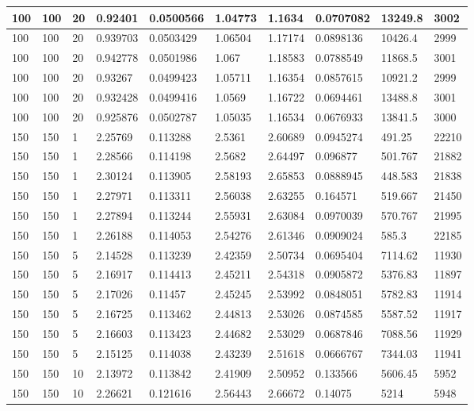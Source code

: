 \begin{landscape}
\begin{longtable}{ | l | l | l | l | l | l | l | l | l | l | }
100 & 100 & 20 & 0.92401 & 0.0500566 & 1.04773 & 1.1634 & 0.0707082 & 13249.8 & 3002\\ \hline
100 & 100 & 20 & 0.939703 & 0.0503429 & 1.06504 & 1.17174 & 0.0898136 & 10426.4 & 2999\\ \hline
100 & 100 & 20 & 0.942778 & 0.0501986 & 1.067 & 1.18583 & 0.0788549 & 11868.5 & 3001\\ \hline
100 & 100 & 20 & 0.93267 & 0.0499423 & 1.05711 & 1.16354 & 0.0857615 & 10921.2 & 2999\\ \hline
100 & 100 & 20 & 0.932428 & 0.0499416 & 1.0569 & 1.16722 & 0.0694461 & 13488.8 & 3001\\ \hline
100 & 100 & 20 & 0.925876 & 0.0502787 & 1.05035 & 1.16534 & 0.0676933 & 13841.5 & 3000\\ \hline
150 & 150 & 1 & 2.25769 & 0.113288 & 2.5361 & 2.60689 & 0.0945274 & 491.25 & 22210\\ \hline
150 & 150 & 1 & 2.28566 & 0.114198 & 2.5682 & 2.64497 & 0.096877 & 501.767 & 21882\\ \hline
150 & 150 & 1 & 2.30124 & 0.113905 & 2.58193 & 2.65853 & 0.0888945 & 448.583 & 21838\\ \hline
150 & 150 & 1 & 2.27971 & 0.113311 & 2.56038 & 2.63255 & 0.164571 & 519.667 & 21450\\ \hline
150 & 150 & 1 & 2.27894 & 0.113244 & 2.55931 & 2.63084 & 0.0970039 & 570.767 & 21995\\ \hline
150 & 150 & 1 & 2.26188 & 0.114053 & 2.54276 & 2.61346 & 0.0909024 & 585.3 & 22185\\ \hline
150 & 150 & 5 & 2.14528 & 0.113239 & 2.42359 & 2.50734 & 0.0695404 & 7114.62 & 11930\\ \hline
150 & 150 & 5 & 2.16917 & 0.114413 & 2.45211 & 2.54318 & 0.0905872 & 5376.83 & 11897\\ \hline
150 & 150 & 5 & 2.17026 & 0.11457 & 2.45245 & 2.53992 & 0.0848051 & 5782.83 & 11914\\ \hline
150 & 150 & 5 & 2.16725 & 0.113462 & 2.44813 & 2.53026 & 0.0874585 & 5587.52 & 11917\\ \hline
150 & 150 & 5 & 2.16603 & 0.113423 & 2.44682 & 2.53029 & 0.0687846 & 7088.56 & 11929\\ \hline
150 & 150 & 5 & 2.15125 & 0.114038 & 2.43239 & 2.51618 & 0.0666767 & 7344.03 & 11941\\ \hline
150 & 150 & 10 & 2.13972 & 0.113842 & 2.41909 & 2.50952 & 0.133566 & 5606.45 & 5952\\ \hline
150 & 150 & 10 & 2.26621 & 0.121616 & 2.56443 & 2.66672 & 0.14075 & 5214 & 5948\\ \hline

\end{longtable}
\end{landscape}
